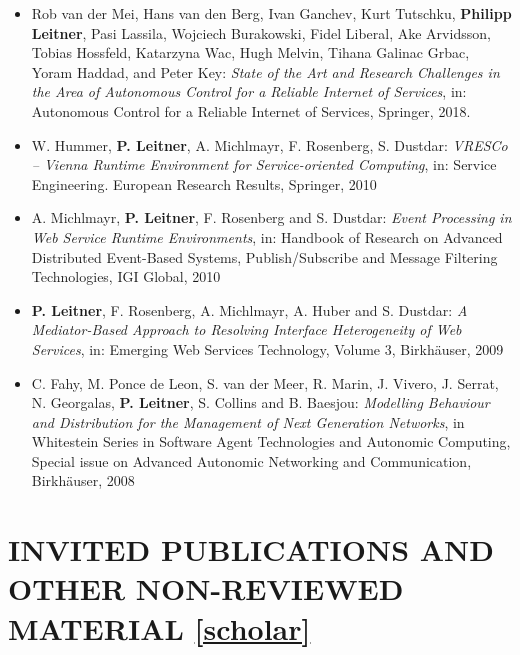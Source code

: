 \documentclass[paper=letter,fontsize=11pt]{scrartcl} %
\newcommand{\NewPart}[2]{\section*{\uppercase{#1} #2}}
\begin{document}
\begin{itemize}
	\item Rob van der Mei, Hans van den Berg, Ivan Ganchev, Kurt Tutschku, \textbf{Philipp Leitner}, Pasi Lassila, Wojciech Burakowski, Fidel Liberal, Ake Arvidsson, Tobias Hossfeld, Katarzyna Wac, Hugh Melvin, Tihana Galinac Grbac, Yoram Haddad, and Peter Key:
	\emph{State of the Art and Research Challenges in the Area of Autonomous Control for a Reliable Internet of Services},
	in: Autonomous Control for a Reliable Internet of Services, Springer, 2018.
\item W. Hummer, \textbf{P. Leitner}, A. Michlmayr, F. Rosenberg, S. Dustdar:
\emph{VRESCo -- Vienna Runtime Environment for Service-oriented Computing},
in: Service Engineering. European Research Results, Springer, 2010
\item A. Michlmayr, \textbf{P. Leitner}, F. Rosenberg and S. Dustdar: \emph{Event
Processing in Web Service Runtime Environments}, in: Handbook of
Research on Advanced Distributed Event-Based Systems, Publish/Subscribe and
Message Filtering Technologies, IGI Global, 2010
\item \textbf{P. Leitner}, F. Rosenberg, A. Michlmayr, A. Huber and S. Dustdar:
\emph{A Mediator-Based Approach to Resolving Interface Heterogeneity of Web
Services}, in: Emerging Web Services Technology, Volume 3,
Birkh\"auser, 2009
\item C. Fahy, M. Ponce de Leon, S. van der Meer, R. Marin, J. Vivero, J. Serrat,
N. Georgalas, \textbf{P. Leitner}, S. Collins and B. Baesjou: \emph{Modelling
Behaviour and Distribution for the Management of Next Generation Networks},
in Whitestein Series in Software Agent Technologies and Autonomic
Computing, Special issue on Advanced Autonomic Networking and Communication,
Birkh\"auser, 2008
\end{itemize}

\NewPart{Invited Publications and Other Non-Reviewed Material}{\href{https://scholar.google.ch/citations?user=wZ9f8CAAAAAJ}{[scholar]}}
\end{document}
